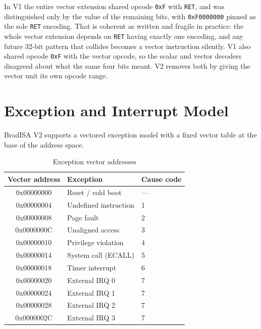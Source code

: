 \documentclass[11pt,a4paper]{article}
\begin{document}
In V1 the entire vector extension shared opcode {\tt 0xF} with {\tt RET}, and
was distinguished only by the value of the remaining bits, with
\texttt{0xF0000000} pinned as the sole {\tt RET} encoding. That is coherent as
written and fragile in practice: the whole vector extension depends on {\tt RET}
having exactly one encoding, and any future 32-bit pattern that collides becomes
a vector instruction silently. V1 also shared opcode {\tt 0xF} with the vector
opcode, so the scalar and vector decoders disagreed about what the same four
bits meant. V2 removes both by giving the vector unit its own opcode range.

\newpage

\newpage

\section{Exception and Interrupt Model}

BradISA V2 supports a vectored exception model with a fixed vector table at
the base of the address space.

\begin{table}[htbp]
\centering
\caption{Exception vector addresses}
\begin{tabular}{cll}
\toprule
Vector address & Exception       & Cause code \\
\midrule
0x00000000 & Reset / cold boot        & ---  \\
0x00000004 & Undefined instruction    & 1    \\
0x00000008 & Page fault               & 2    \\
0x0000000C & Unaligned access         & 3    \\
0x00000010 & Privilege violation      & 4    \\
0x00000014 & System call (ECALL)      & 5    \\
0x00000018 & Timer interrupt          & 6    \\
0x00000020 & External IRQ 0           & 7    \\
0x00000024 & External IRQ 1           & 7    \\
0x00000028 & External IRQ 2           & 7    \\
0x0000002C & External IRQ 3           & 7    \\
\bottomrule
\end{tabular}
\end{table}
\end{document}
